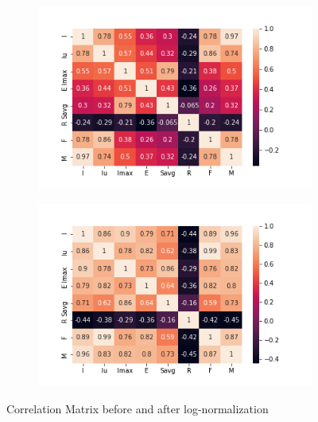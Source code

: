 \begin{figure}
\begin{subfigure}{.49\textwidth}
\centering
\includegraphics[width=.95\textwidth]{img/features_corr.png}
\caption{}
\label{fig:features_corr}
\end{subfigure}
\begin{subfigure}{.49\textwidth}
\centering
\captionsetup{justification=centering}
\includegraphics[width=.95\textwidth]{img/features_corr_logs.png}
\caption{}
\label{fig:features_corr_logs}
\end{subfigure}
\caption{Correlation Matrix before and after log-normalization}
\end{figure}

